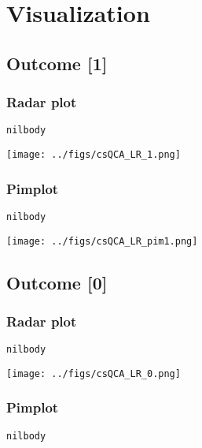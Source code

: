 \documentclass[11pt]{article}
\begin{document}
\section*{Visualization}
\label{sec:org24ca43b}

\subsection*{Outcome [1]}
\label{sec:org472e419}
\subsubsection*{Radar plot}
\label{sec:orgb7bae02}
\begin{verbatim}
nilbody
\end{verbatim}

\begin{center}
\texttt{[image: ../figs/csQCA\_LR\_1.png]}
\end{center}
\subsubsection*{Pimplot}
\label{sec:org18d1559}
\begin{verbatim}
nilbody
\end{verbatim}

\begin{center}
\texttt{[image: ../figs/csQCA\_LR\_pim1.png]}
\end{center}

\subsection*{Outcome [0]}
\label{sec:orge968d61}
\subsubsection*{Radar plot}
\label{sec:orgc71d195}
\begin{verbatim}
nilbody
\end{verbatim}

\begin{center}
\texttt{[image: ../figs/csQCA\_LR\_0.png]}
\end{center}

\subsubsection*{Pimplot}
\label{sec:org5bdba17}
\begin{verbatim}
nilbody
\end{verbatim}
\end{document}
